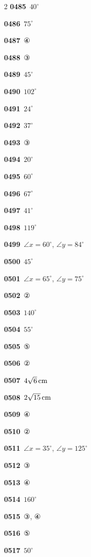 \documentclass[10pt,a4paper]{article}
\begin{document}
\begin{multicols}{2}
\noindent\textbf{0485}\ $40^\circ$\par
\noindent\textbf{0486}\ $75^\circ$\par
\noindent\textbf{0487}\ ④\par
\noindent\textbf{0488}\ ③\par
\noindent\textbf{0489}\ $45^\circ$\par
\noindent\textbf{0490}\ $102^\circ$\par
\noindent\textbf{0491}\ $24^\circ$\par
\noindent\textbf{0492}\ $37^\circ$\par
\noindent\textbf{0493}\ ③\par
\noindent\textbf{0494}\ $20^\circ$\par
\noindent\textbf{0495}\ $60^\circ$\par
\noindent\textbf{0496}\ $67^\circ$\par
\noindent\textbf{0497}\ $41^\circ$\par
\noindent\textbf{0498}\ $119^\circ$\par
\noindent\textbf{0499}\ $\angle x=60^\circ$, $\angle y=84^\circ$\par
\noindent\textbf{0500}\ $45^\circ$\par
\noindent\textbf{0501}\ $\angle x=65^\circ$, $\angle y=75^\circ$\par
\noindent\textbf{0502}\ ②\par
\noindent\textbf{0503}\ $140^\circ$\par
\noindent\textbf{0504}\ $55^\circ$\par
\noindent\textbf{0505}\ ⑤\par
\noindent\textbf{0506}\ ②\par
\noindent\textbf{0507}\ $4\sqrt{6}\mkern3mu \mathrm{cm}$\par
\noindent\textbf{0508}\ $2\sqrt{15}\mkern3mu \mathrm{cm}$\par
\noindent\textbf{0509}\ ④\par
\noindent\textbf{0510}\ ②\par
\noindent\textbf{0511}\ $\angle x=35^\circ$, $\angle y=125^\circ$\par
\noindent\textbf{0512}\ ③\par
\noindent\textbf{0513}\ ④\par
\noindent\textbf{0514}\ $160^\circ$\par
\noindent\textbf{0515}\ ③, ④\par
\noindent\textbf{0516}\ ⑤\par
\noindent\textbf{0517}\ $50^\circ$\par

\end{multicols}
\end{document}
